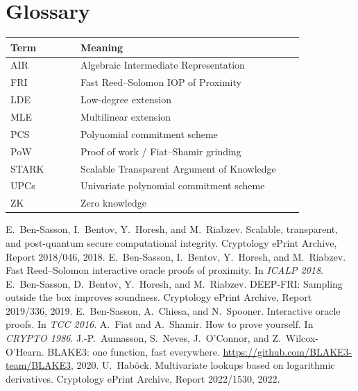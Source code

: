 \documentclass[11pt,a4paper]{article}
\begin{document}
\section{Glossary}

\begin{longtable}{@{}L{0.22\linewidth}L{0.70\linewidth}@{}}
\toprule
Term & Meaning \\
\midrule
\endhead
AIR & Algebraic Intermediate Representation \\
FRI & Fast Reed--Solomon IOP of Proximity \\
LDE & Low-degree extension \\
MLE & Multilinear extension \\
PCS & Polynomial commitment scheme \\
PoW & Proof of work / Fiat--Shamir grinding \\
STARK & Scalable Transparent Argument of Knowledge \\
UPCs & Univariate polynomial commitment scheme \\
ZK & Zero knowledge \\
\bottomrule
\end{longtable}

\begin{thebibliography}{9}
E.~Ben-Sasson, I.~Bentov, Y.~Horesh, and M.~Riabzev.
\newblock Scalable, transparent, and post-quantum secure computational integrity.
\newblock Cryptology ePrint Archive, Report 2018/046, 2018.
E.~Ben-Sasson, I.~Bentov, Y.~Horesh, and M.~Riabzev.
\newblock Fast Reed--Solomon interactive oracle proofs of proximity.
\newblock In \emph{ICALP 2018}.
E.~Ben-Sasson, D.~Bentov, Y.~Horesh, and M.~Riabzev.
\newblock DEEP-FRI: Sampling outside the box improves soundness.
\newblock Cryptology ePrint Archive, Report 2019/336, 2019.
E.~Ben-Sasson, A.~Chiesa, and N.~Spooner.
\newblock Interactive oracle proofs.
\newblock In \emph{TCC 2016}.
A.~Fiat and A.~Shamir.
\newblock How to prove yourself.
\newblock In \emph{CRYPTO 1986}.
J.-P.~Aumasson, S.~Neves, J.~O'Connor, and Z.~Wilcox-O'Hearn.
\newblock BLAKE3: one function, fast everywhere.
\newblock \url{https://github.com/BLAKE3-team/BLAKE3}, 2020.
U.~Hab\"ock.
\newblock Multivariate lookups based on logarithmic derivatives.
\newblock Cryptology ePrint Archive, Report 2022/1530, 2022.
\end{thebibliography}
\end{document}
